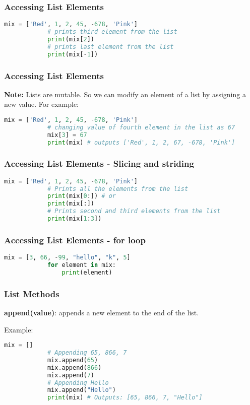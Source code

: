 \documentclass[14pt]{beamer}
\begin{document}
    \begin{frame}[containsverbatim]
        \frametitle{Accessing List Elements}
        \begin{lstlisting}[language=Python]
            mix = ['Red', 1, 2, 45, -678, 'Pink']
            # prints third element from the list
            print(mix[2])
            # prints last element from the list
            print(mix[-1])
        \end{lstlisting}
    \end{frame}
    \begin{frame}[containsverbatim]
        \frametitle{Accessing List Elements}
        \textbf{Note:} Lists are mutable. So we can modify an element of a list by assigning a new value. For example:

        \begin{lstlisting}[language=Python]
            mix = ['Red', 1, 2, 45, -678, 'Pink']
            # changing value of fourth element in the list as 67
            mix[3] = 67
            print(mix) # outputs ['Red', 1, 2, 67, -678, 'Pink']
        \end{lstlisting}
    \end{frame}
    \begin{frame}[containsverbatim]
        \frametitle{Accessing List Elements - Slicing and striding}
        \begin{lstlisting}[language=Python]
            mix = ['Red', 1, 2, 45, -678, 'Pink']
            # Prints all the elements from the list
            print(mix[0:]) # or
            print(mix[:])
            # Prints second and third elements from the list
            print(mix[1:3])
        \end{lstlisting}
    \end{frame}
    \begin{frame}[containsverbatim]
        \frametitle{Accessing List Elements - for loop}
        \begin{lstlisting}[language=Python]
            mix = [3, 66, -99, "hello", "k", 5]
            for element in mix:
                print(element)
        \end{lstlisting}
    \end{frame}
    \begin{frame}[containsverbatim]
        \frametitle{List Methods}
        \textbf {append(value)}: appends a new element to the end of the list.
        
        \alert{Example:} 
        \begin{lstlisting}[language=Python]
            mix = []
            # Appending 65, 866, 7
            mix.append(65)
            mix.append(866)
            mix.append(7)
            # Appending Hello
            mix.append("Hello")
            print(mix) # Outputs: [65, 866, 7, "Hello"]
        \end{lstlisting}
    \end{frame}
\end{document}
